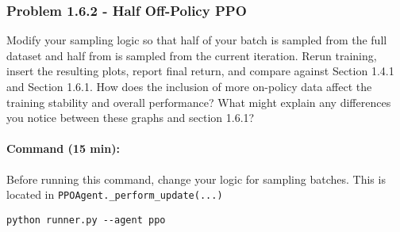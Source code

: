 \documentclass[12pt]{article}
\begin{document}
\begin{solution}[height=5cm]
\end{solution}
\subsubsection*{Problem 1.6.2 - Half Off-Policy PPO}
Modify your sampling logic so that half of your batch is sampled from the full dataset and half from is sampled from the current iteration.  Rerun training, insert the resulting plots, report final return, and compare against Section 1.4.1 and Section 1.6.1. How does the inclusion of more on-policy data affect the training stability and overall performance?  What might explain any differences you notice between these graphs and section 1.6.1?

\paragraph{Command (15 min):} Before running this command, change your logic for sampling batches.  This is located in \texttt{PPOAgent.\_perform\_update(...)}
\begin{verbatim}
python runner.py --agent ppo
\end{verbatim}

\begin{solution}[height=5cm]
\end{solution}





\end{document}
